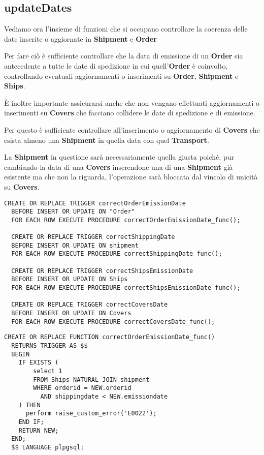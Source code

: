 \subsection{\textbf{updateDates}}

Vediamo ora l'insieme di funzioni che si occupano controllare la coerenza delle date inserite o aggiornate in \textbf{Shipment} e \textbf{Order}

Per fare ciò è sufficiente controllare che la data di emissione di un \textbf{Order} sia antecedente a tutte le date di spedizione in cui quell'\textbf{Order} è coinvolto, controllando eventuali aggiornamenti o inserimenti su \textbf{Order}, \textbf{Shipment} e \textbf{Ships}.

È inoltre importante assicurarsi anche che non vengano effettuati aggiornamenti o inserimenti su \textbf{Covers} che facciano collidere le date di spedizione e di emissione.

Per questo è sufficiente controllare all'inserimento o aggiornamento di \textbf{Covers} che esista almeno una \textbf{Shipment} in quella data con quel \textbf{Transport}.

La \textbf{Shipment} in questione sarà necessariamente quella giusta poiché, pur cambiando la data di una \textbf{Covers} inserendone una di una \textbf{Shipment} già esistente ma che non la riguarda, l'operazione sarà bloccata dal vincolo di unicità su \textbf{Covers}.

\begin{lstlisting}[caption={Trigger per implementare \textbf{updateDates}}]
  CREATE OR REPLACE TRIGGER correctOrderEmissionDate
  BEFORE INSERT OR UPDATE ON "Order"
  FOR EACH ROW EXECUTE PROCEDURE correctOrderEmissionDate_func();

  CREATE OR REPLACE TRIGGER correctShippingDate
  BEFORE INSERT OR UPDATE ON shipment
  FOR EACH ROW EXECUTE PROCEDURE correctShippingDate_func();

  CREATE OR REPLACE TRIGGER correctShipsEmissionDate
  BEFORE INSERT OR UPDATE ON Ships
  FOR EACH ROW EXECUTE PROCEDURE correctShipsEmissionDate_func();

  CREATE OR REPLACE TRIGGER correctCoversDate
  BEFORE INSERT OR UPDATE ON Covers
  FOR EACH ROW EXECUTE PROCEDURE correctCoversDate_func();
\end{lstlisting}

\begin{lstlisting}[caption={Funzione \textbf{correctOrderEmissionDate}}]
  CREATE OR REPLACE FUNCTION correctOrderEmissionDate_func()
  RETURNS TRIGGER AS $$
  BEGIN
    IF EXISTS (
        select 1 
        FROM Ships NATURAL JOIN shipment
        WHERE orderid = NEW.orderid
          AND shippingdate < NEW.emissiondate
    ) THEN 
      perform raise_custom_error('E0022');
    END IF;
    RETURN NEW;
  END;
  $$ LANGUAGE plpgsql;
\end{lstlisting}

